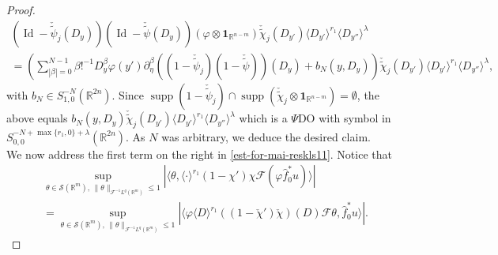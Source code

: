 \documentclass[12pt,reqno]{amsart}
\newcommand{\RR}{\mathbb R}
\newcommand{\SSS}{\mathcal S}
\newcommand{\supp}{\operatorname{supp}}
\theoremstyle{plain}
\theoremstyle{remark}
\theoremstyle{definition}
\numberwithin{equation}{section}
\begin{document}
\begin{proof}
\begin{multline*}
(\operatorname{Id}-\check{\widetilde{\psi}}_j(D_y))(\operatorname{Id}-\check{\widetilde{\psi}}(D_y))(\varphi\otimes\mathbf{1}_{\RR^{n-m}})
\check{\widetilde{\chi}}_j(D_{y'})\langle D_{y'}\rangle^{r_1}\langle D_{y''}\rangle^{\lambda}\\
=\left(\sum_{|\beta|=0}^{N-1}\beta!^{-1}D^{\beta}_y\varphi(y') \partial^{\beta}_{\eta}\left((1-\check{\widetilde{\psi}}_j)(1-\check{\widetilde{\psi}})\right)(D_y)+b_N(y,D_y)\right) \check{\widetilde{\chi}}_j(D_{y'})\langle D_{y'}\rangle^{r_1}\langle D_{y''}\rangle^{\lambda},
\end{multline*}
with $b_N\in S^{-N}_{1,0}(\RR^{2n})$. Since $\supp(1-\check{\widetilde{\psi}}_j)\cap\supp(\check{\widetilde{\chi}}_j\otimes\mathbf{1}_{\RR^{n-m}})=\emptyset$, the above equals $b_N(y,D_y)\check{\widetilde{\chi}}_j(D_{y'})\langle D_{y'}\rangle^{r_1}\langle D_{y''}\rangle^{\lambda}$ which is a $\Psi$DO with symbol in $S^{-N+\max\{r_1,0\}+\lambda}_{0,0}(\RR^{2n})$. As $N$ was arbitrary, we deduce the desired claim.\\
\indent We now address the first term on the right in \eqref{est-for-mai-reskls11}. Notice that
\begin{multline}\label{equ-for-semofpulbkhsfs}
\sup_{\theta\in\SSS(\RR^m),\, \|\theta\|_{\mathcal{F}^{-1}L^q(\RR^m)}\leq1}|\langle \theta,\langle\cdot\rangle^{r_1}(1-\chi')\chi\mathcal{F}(\varphi \hat{f}_0^*u)\rangle|\\
=\sup_{\theta\in\SSS(\RR^m),\, \|\theta\|_{\mathcal{F}^{-1}L^q(\RR^m)}\leq1}|\langle \varphi\langle D\rangle^{r_1}((1-\check{\chi}')\check{\chi})(D)\mathcal{F}\theta,\hat{f}_0^*u\rangle|.
\end{multline}

\end{proof}
\end{document}
